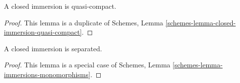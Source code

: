 \begin{lemma}
\label{lemma-closed-immersion-quasi-compact}
A closed immersion is quasi-compact.
\end{lemma}

\begin{proof}
This lemma is a duplicate of
Schemes, Lemma \ref{schemes-lemma-closed-immersion-quasi-compact}.
\end{proof}

\begin{lemma}
\label{lemma-closed-immersion-separated}
A closed immersion is separated.
\end{lemma}

\begin{proof}
This lemma is a special case of
Schemes, Lemma \ref{schemes-lemma-immersions-monomorphisms}.
\end{proof}






